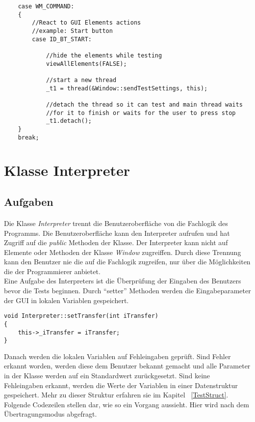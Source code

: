 \begin{lstlisting}	 
	case WM_COMMAND:
	{
		//React to GUI Elements actions
		//example: Start button
		case ID_BT_START:

			//hide the elements while testing
			viewAllElements(FALSE);

			//start a new thread
			_t1 = thread(&Window::sendTestSettings, this);

			//detach the thread so it can test and main thread waits
			//for it to finish or waits for the user to press stop
			_t1.detach();
	}
    break;
\end{lstlisting}




\newpage

\section{Klasse Interpreter}
\subsection{Aufgaben}
\paragraph{}
Die Klasse \textit{Interpreter} trennt die Benutzeroberfläche von die Fachlogik des Programms. Die Benutzeroberfläche kann den Interpreter aufrufen und hat Zugriff auf die \textit{public} Methoden der Klasse. Der Interpreter kann nicht auf Elemente oder Methoden der Klasse \textit{Window} zugreiffen. Durch diese Trennung kann den Benutzer nie die auf die Fachlogik zugreifen, nur über die Möglichkeiten die der Programmierer anbietet.\\

Eine Aufgabe des Interpreters ist die Überprüfung der Eingaben des Benutzers bevor die Tests beginnen. Durch "`setter"' Methoden werden die Eingabeparameter der GUI in lokalen Variablen gespeichert.\\


\begin{lstlisting}	 
void Interpreter::setTransfer(int iTransfer)
{
	this->_iTransfer = iTransfer;
}
\end{lstlisting}

Danach werden die lokalen Variablen auf Fehleingaben geprüft. Sind Fehler erkannt worden, werden diese dem Benutzer bekannt gemacht und alle Parameter in der Klasse werden auf ein Standardwert zurückgesetzt. Sind keine Fehleingaben erkannt, werden die Werte der Variablen in einer Datenstruktur gespeichert. Mehr zu dieser Struktur erfahren sie im Kapitel ~\ref{TestStruct}. Folgende Codezeilen stellen dar, wie so ein Vorgang aussieht. Hier wird nach dem Übertragungsmodus abgefragt.


